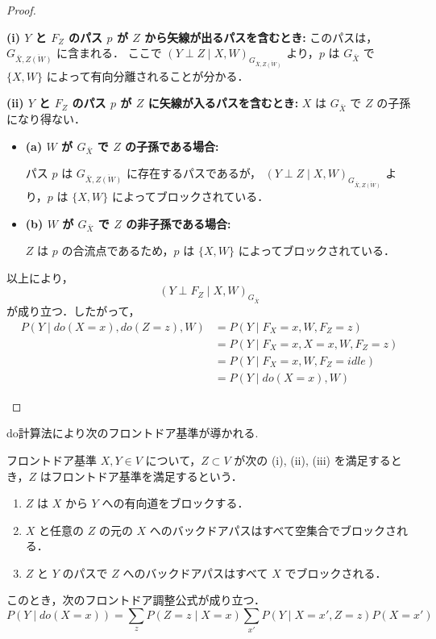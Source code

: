 \documentclass[uplatex, dvipdfmx]{jsarticle}
\begin{document}
\begin{proof}
\begin{enumerate}[label={\textbf{[規則\arabic*]}}, leftmargin=*]
  \noindent \textbf{(i) $Y$ と $F_Z$ のパス $p$ が $Z$ から矢線が出るパスを含むとき:}
  このパスは，$G_{\bar{X}, \overline{Z(W)}}$ に含まれる．
  ここで $(Y \perp Z \mid X, W)_{G_{\bar{X}, \overline{Z(W)}}}$ より，$p$ は $G_{\bar{X}}$ で $\{X, W\}$ によって有向分離されることが分かる．

  \noindent \textbf{(ii) $Y$ と $F_Z$ のパス $p$ が $Z$ に矢線が入るパスを含むとき:}
  $X$ は $G_{\bar{X}}$ で $Z$ の子孫になり得ない．
  \begin{itemize}
    \item \textbf{(a) $W$ が $G_{\bar{X}}$ で $Z$ の子孫である場合:}

    パス $p$ は $G_{\bar{X}, \overline{Z(W)}}$ に存在するパスであるが， $(Y \perp Z \mid X, W)_{G_{\bar{X}, \overline{Z(W)}}}$ より，$p$ は $\{X, W\}$ によってブロックされている．

    \item \textbf{(b) $W$ が $G_{\bar{X}}$ で $Z$ の非子孫である場合:}

    $Z$ は $p$ の合流点であるため，$p$ は $\{X, W\}$ によってブロックされている．
  \end{itemize}
  以上により，
  \begin{equation}
    (Y \perp F_Z \mid X, W)_{G_{\bar{X}}}
  \end{equation}
  が成り立つ．したがって，
  \begin{align}
    P(Y \mid do(X=x), do(Z=z), W) &= P(Y \mid F_X=x, W, F_Z=z) \\
    &= P(Y \mid F_X=x, X=x, W, F_Z=z) \\
    &= P(Y \mid F_X=x, W, F_Z=idle) \\
    &= P(Y \mid do(X=x), W)
  \end{align}
  \end{enumerate}
\end{proof}

do計算法により次のフロントドア基準が導かれる.

\begin{prop}{フロントドア基準}
  $X, Y \in V$ について，$Z \subset V$ が次の (i), (ii), (iii) を満足するとき，$Z$ はフロントドア基準を満足するという．
  \begin{enumerate}
    \item $Z$ は $X$ から $Y$ への有向道をブロックする．
    \item $X$ と任意の $Z$ の元の $X$ へのバックドアパスはすべて空集合でブロックされる．
    \item $Z$ と $Y$ のパスで $Z$ へのバックドアパスはすべて $X$ でブロックされる．
  \end{enumerate}
  このとき，次のフロントドア調整公式が成り立つ．
  \begin{equation}
    P(Y \mid do(X=x)) = \sum_z P(Z=z \mid X=x) \sum_{x'} P(Y \mid X=x', Z=z) P(X=x')
  \end{equation}
\end{prop}
\end{document}
